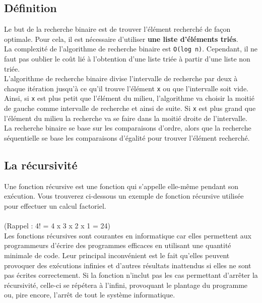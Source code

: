 \subsection{Définition}

Le but de la recherche binaire est de trouver l'élément recherché de façon optimale. Pour cela, il est nécessaire d'utiliser \textbf{une liste d'éléments triés}.\\

La complexité de l'algorithme de recherche binaire est \lstinline{O(log n)}. Cependant, il ne faut pas oublier le coût lié à l'obtention d'une liste triée à partir d'une liste non triée.\\

L'algorithme de recherche binaire divise l'intervalle de recherche par deux à chaque itération jusqu'à ce qu'il trouve l'élément \lstinline{x} ou que l'intervalle soit vide.\\

Ainsi, si \lstinline{x} est plus petit que l'élément du milieu, l'algorithme va choisir la moitié de gauche comme intervalle de recherche et ainsi de suite. Si \lstinline{x} est plus grand que l'élément du milieu la recherche va se faire dans la moitié droite de l'intervalle.\\

La recherche binaire se base sur les comparaisons d'ordre, alors que la recherche séquentielle se base les comparaisons d'égalité pour trouver l'élément recherché.\\

\subsection{La récursivité}

Une fonction récursive est une fonction qui s'appelle elle-même pendant son exécution. Vous trouverez ci-dessous un exemple de fonction récursive utilisée pour effectuer un calcul factoriel.\\\\
(Rappel : 4! = 4 x 3 x 2 x 1 = 24)\\



Les fonctions récursives sont courantes en informatique car elles permettent aux programmeurs d'écrire des programmes efficaces en utilisant une quantité minimale de code. Leur principal inconvénient est le fait qu'elles peuvent provoquer des exécutions infinies et d'autres résultats inattendus si elles ne sont pas écrites correctement. Si la fonction n'inclut pas les cas permettant d'arrêter la récursivité, celle-ci se répétera à l'infini, provoquant le plantage du programme ou, pire encore, l'arrêt de tout le système informatique.\\
   
